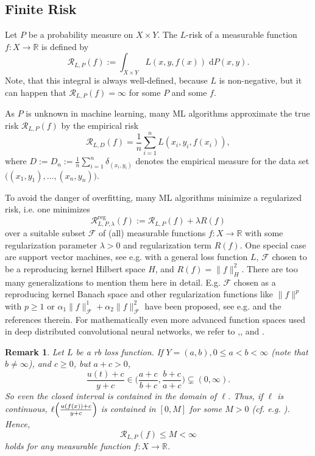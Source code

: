 \documentclass[10pt]{article}
\newcommand{\R}{\mathbb{R}}
\newcommand{\XY}{X \times Y}
\newcommand{\RLP}{\mathcal{R}_{L,P}}
\newcommand{\RLD}{\mathcal{R}_{L,D}}
\newcommand{\RregLP}{\mathcal{R}^{\mathrm{reg}}_{L,P,\lambda}}
\newtheorem{remark}[theorem]{Remark}
\begin{document}
\subsection{Finite Risk} \label{Kap_endlRisiko}
Let $P$ be a probability measure on $\XY$.
The $L$-risk of a measurable function $f: X \to \R$ is defined by
\begin{equation*}
	\RLP(f) := \int_{\XY} L(x,y,f(x)) \; \mathrm{d}P(x,y).
\end{equation*}
Note, that this integral is always well-defined, because $L$ is non-negative, but it can happen that $\RLP(f)=\infty$ for some $P$ and some $f$.\par 
As $P$ is unknown in machine learning, many ML algorithms approximate
the true risk $\RLP(f)$ by the empirical risk 
\begin{equation*}
	\RLD(f) = \frac{1}{n} \sum_{i=1}^n L(x_i,y_i,f(x_i)),
\end{equation*}
where $D:=D_n := \frac{1}{n} \sum_{i =1}^n \delta_{(x_i, y_i)}$ denotes the empirical measure for the data set $\bigl((x_1,y_1),\dots,(x_n,y_n)\bigr)$.\par 
To avoid the danger of overfitting, many ML algorithms minimize a regularized  risk, i.e. one minimizes
\begin{equation*}
	\RregLP(f):= \RLP(f) + \lambda R(f)
\end{equation*}
over a suitable subset $\mathcal{F}$ of (all) measurable functions $f: X \to \R$ with some regularization parameter $\lambda > 0$ and regularization term $R(f)$. 
One special case are support vector machines, see e.g. \cite{Vapnik1995, Vapnik1998, SC08} with a general loss function $L$, $\mathcal{F}$ chosen to be a reproducing kernel Hilbert space $H$, and $R(f)=\|f\|_H^2$. 
There are too many generalizations to mention them here in detail. 
E.g. $\mathcal{F}$ chosen as a reproducing kernel Banach space and other regularization functions like $\|f\|^p$ with $p\ge 1$ or $\alpha_1 \|f\|_{\mathcal{F}}^1 + \alpha_2\|f\|_{\mathcal{F}}^2$ have been proposed, see e.g. \cite{ZhangXuZhang2009,DeMolDeVitoRosasco2009,RosascoEtAl2013, CuckerZhou2007} and the references therein.
For mathematically even more advanced function spaces used in deep distributed convolutional neural networks, we refer to  
\cite{Zhou2018},\cite{LinWangWangZhou2022}, and \cite{ZhangShiZhou2024}.
\begin{remark}
	Let $L$ be a rb loss function.
	If $Y = (a,b), 0 \leq a < b < \infty$ (note that $b \neq \infty$), and $c \geq 0$, but $a+c>0$,
	\begin{equation*}
		\frac{u(t)+c}{y+c} \in \biggl(\frac{a+c}{b+c}, \frac{b+c}{a+c}\biggr) \subsetneq (0, \infty).
	\end{equation*}
	So even the closed interval is contained in the domain of $\ell$.
	Thus, if $\ell$ is continuous, $\ell\Bigl(\frac{u(f(x))+c}{y+c}\Bigr)$ is contained in $[0, M]$ for some $M > 0$ (cf. e.g. \cite[p. 90]{Königsberger2004}).
	Hence, 
	\begin{equation*}
		\mathcal{R}_{L, P}(f) \leq M < \infty
	\end{equation*}
	holds for any measurable function $f: X \to \R$.
\end{remark}
\end{document}
